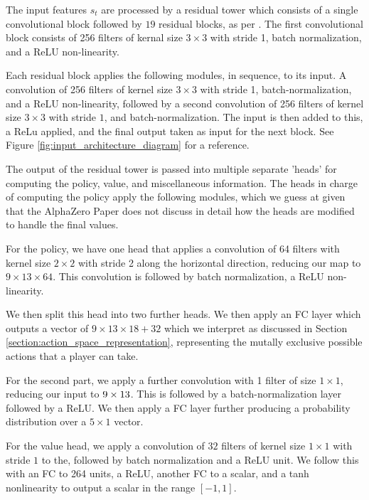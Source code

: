 \documentclass[12pt,twocolumn,letterpaper]{article}
\begin{document}
The input features $s_t$ are processed by a residual tower which consists of a single convolutional block  followed by $19$ residual blocks, as per \cite{AlphaGoZero}. The first convolutional block consists of 256 filters of kernal size $3 \times 3$ with stride 1, batch normalization, and a ReLU non-linearity. 

Each residual block applies the following modules, in sequence, to its input. A convolution of 256 filters of kernel size $3 \times 3$ with stride 1, batch-normalization, and a ReLU non-linearity, followed by a second convolution of 256 filters of kernel size $3 \times 3$ with stride $1$, and batch-normalization. The input is then added to this, a ReLu applied, and the final output taken as input for the next block. See Figure \ref{fig:input_architecture_diagram} for a reference.

The output of the residual tower is passed into multiple separate 'heads' for computing the policy, value, and miscellaneous information. The heads in charge of computing the policy apply the following modules, which we guess at given that the AlphaZero Paper \cite{AlphaZero} does not discuss in detail how the heads are modified to handle the final values.

For the policy, we have one head that applies a convolution of 64 filters with kernel size $2 \times 2$ with stride 2 along the horizontal direction, reducing our map to $9 \times 13 \times 64$. This convolution is followed by batch normalization, a ReLU non-linearity.

We then split this head into two further heads. We then apply an FC layer which outputs a vector of $9 \times 13 \times 18 + 32$ which we interpret as discussed in Section \ref{section:action_space_representation}, representing the mutally exclusive possible actions that a player can take.

For the second part, we apply a further convolution with 1 filter of size $1 \times 1$, reducing our input to $9 \times 13 \time 1$. This is followed by a batch-normalization layer followed by a ReLU. We then apply a FC layer further producing a probability distribution over a $5 \times 1$ vector.


For the value head, we apply a convolution of $32$ filters of kernel size $1 \times 1$ with stride $1$ to the, followed by batch normalization and a ReLU unit. We follow this with an FC to 264 units, a ReLU, another FC to a scalar, and a tanh nonlinearity to output a scalar in the range $[-1, 1]$.
\end{document}
